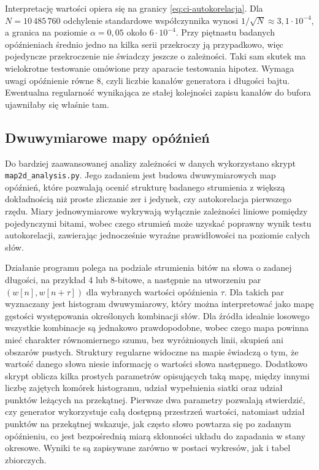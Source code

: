Interpretację wartości opiera się na granicy \eqref{eq:ci-autokorelacja}. Dla
$N = 10\,485\,760$ odchylenie standardowe współczynnika wynosi
$1/\sqrt{N} \approx 3{,}1\cdot 10^{-4}$, a granica na poziomie $\alpha = 0{,}05$
około $6\cdot 10^{-4}$. Przy piętnastu badanych opóźnieniach średnio jedno na
kilka serii przekroczy ją przypadkowo, więc pojedyncze przekroczenie nie
świadczy jeszcze o zależności. Taki sam skutek ma wielokrotne testowanie
omówione przy aparacie testowania hipotez. Wymaga uwagi opóźnienie równe $8$,
czyli liczbie kanałów generatora i długości bajtu. Ewentualna regularność
wynikająca ze stałej kolejności zapisu kanałów do bufora ujawniłaby się
właśnie tam.

\subsection{Dwuwymiarowe mapy opóźnień}

Do bardziej zaawansowanej analizy zależności w danych wykorzystano skrypt
\texttt{map2d\_analysis.py}. Jego zadaniem jest budowa dwuwymiarowych map
opóźnień, które pozwalają ocenić strukturę badanego strumienia z większą
dokładnością niż proste zliczanie zer i jedynek, czy autokorelacja pierwszego
rzędu. Miary jednowymiarowe wykrywają wyłącznie zależności liniowe pomiędzy
pojedynczymi bitami, wobec czego strumień może uzyskać poprawny wynik testu
autokorelacji, zawierając jednocześnie wyraźne prawidłowości na poziomie całych
słów.

Działanie programu polega na podziale strumienia bitów na słowa o zadanej długości,
na przykład 4 lub 8-bitowe, a następnie na utworzeniu par \((w[n], w[n+\tau])\)
dla wybranych wartości opóźnienia \(\tau\). Dla takich par wyznaczany jest
histogram dwuwymiarowy, który można interpretować jako mapę gęstości występowania
określonych kombinacji słów. Dla źródła idealnie losowego wszystkie kombinacje są
jednakowo prawdopodobne, wobec czego mapa powinna mieć charakter równomiernego
szumu, bez wyróżnionych linii, skupień ani obszarów pustych. Struktury regularne
widoczne na mapie świadczą o tym, że wartość danego słowa niesie informację
o wartości słowa następnego. Dodatkowo skrypt oblicza kilka prostych parametrów
opisujących taką mapę, między innymi liczbę zajętych komórek histogramu,
udział wypełnienia siatki oraz udział punktów leżących na przekątnej.
Pierwsze dwa parametry pozwalają stwierdzić, czy generator wykorzystuje całą
dostępną przestrzeń wartości, natomiast udział punktów na przekątnej wskazuje,
jak często słowo powtarza się po zadanym opóźnieniu, co jest bezpośrednią miarą
skłonności układu do zapadania w stany okresowe.
Wyniki te są zapisywane zarówno w postaci wykresów, jak i tabel zbiorczych.

